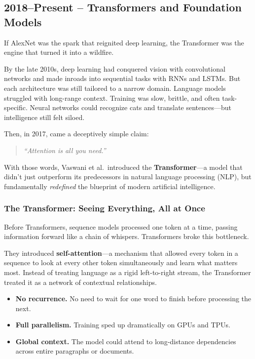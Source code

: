 \subsection{2018–Present – Transformers and Foundation Models}

If AlexNet was the spark that reignited deep learning, the Transformer was the engine that turned it into a wildfire.

By the late 2010s, deep learning had conquered vision with convolutional networks and made inroads into sequential tasks with RNNs and LSTMs. But each architecture was still tailored to a narrow domain. Language models struggled with long-range context. Training was slow, brittle, and often task-specific. Neural networks could recognize cats and translate sentences—but intelligence still felt siloed.

Then, in 2017, came a deceptively simple claim:  
\begin{quote}
\textit{“Attention is all you need.”}
\end{quote}

With those words, Vaswani et al.\ introduced the \textbf{Transformer}—a model that didn’t just outperform its predecessors in natural language processing (NLP), but fundamentally \textit{redefined} the blueprint of modern artificial intelligence.

\subsubsection{The Transformer: Seeing Everything, All at Once}

Before Transformers, sequence models processed one token at a time, passing information forward like a chain of whispers. Transformers broke this bottleneck.

They introduced \textbf{self-attention}—a mechanism that allowed every token in a sequence to look at every other token simultaneously and learn what matters most. Instead of treating language as a rigid left-to-right stream, the Transformer treated it as a network of contextual relationships.

\begin{itemize}
  \item \textbf{No recurrence.} No need to wait for one word to finish before processing the next.
  \item \textbf{Full parallelism.} Training sped up dramatically on GPUs and TPUs.
  \item \textbf{Global context.} The model could attend to long-distance dependencies across entire paragraphs or documents.
\end{itemize}

